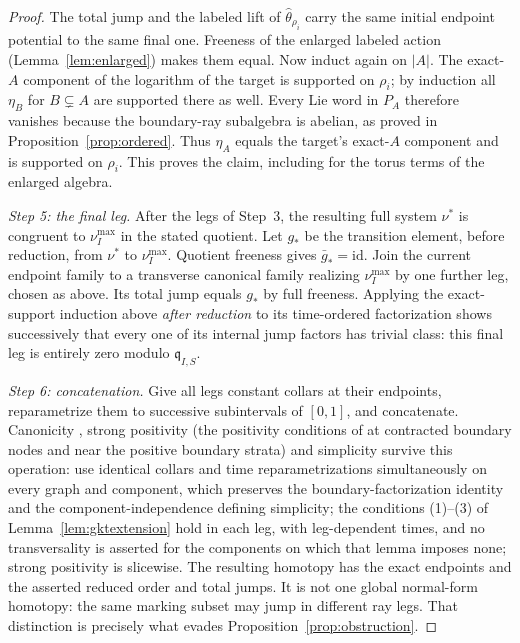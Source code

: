 \documentclass[11pt]{amsart}
\theoremstyle{definition}
\theoremstyle{remark}
\begin{document}
\begin{proof}
The total jump and the labeled lift of $\widehat\theta_{\rho_i}$ carry the same initial
endpoint potential to the same final one. Freeness of the enlarged labeled
action (Lemma~\ref{lem:enlarged}) makes them equal. Now induct again on
$\lvert A\rvert$. The exact-$A$ component of the logarithm of the target is
supported on $\rho_i$; by induction all $\eta_B$ for $B\subsetneq A$ are supported
there as well. Every Lie word in $P_A$ therefore vanishes because the
boundary-ray subalgebra is abelian, as proved in
Proposition~\ref{prop:ordered}. Thus $\eta_A$ equals the target's exact-$A$
component and is supported on $\rho_i$. This proves the claim, including for
the torus terms of the enlarged algebra.

\emph{Step 5: the final leg.}
After the legs of Step~3, the resulting full system $\nu^*$ is congruent to
$\nu_I^{\max}$ in the stated quotient. Let $g_{*}$ be the transition element, before
reduction, from $\nu^*$ to $\nu_I^{\max}$. Quotient freeness gives $\bar g_{*}=\mathrm{id}$. Join
the current endpoint family to a transverse canonical family realizing $\nu_I^{\max}$ by
one further leg, chosen as above. Its total jump equals $g_{*}$ by full
freeness. Applying the exact-support induction above \emph{after reduction} to
its time-ordered factorization shows successively that every one of its
internal jump factors has trivial class: this final leg is entirely
zero modulo $\mathfrak q_{I,S}$.

\emph{Step 6: concatenation.}
Give all legs constant collars at their endpoints, reparametrize them to
successive subintervals of $[0,1]$, and concatenate. Canonicity
\cite[Def.~3.22]{GKT}, strong positivity (the positivity conditions of
\cite[Def.~3.18]{GKT} at contracted boundary nodes and near the positive
boundary strata) and simplicity \cite[Defs.~3.36--3.37]{GKT} survive
this operation: use identical collars and
time reparametrizations simultaneously on every graph and component, which
preserves the boundary-factorization identity \cite[(3.12)]{GKT} and the
component-independence defining simplicity; the conditions (1)--(3) of
Lemma~\ref{lem:gktextension} hold in each leg, with leg-dependent times, and
no transversality is asserted for the components on which that lemma imposes
none; strong positivity is slicewise.
The resulting homotopy has the exact endpoints and the asserted reduced order
and total jumps. It is not one global normal-form homotopy: the same
marking subset may jump in different ray legs. That distinction is precisely
what evades Proposition~\ref{prop:obstruction}.

\end{proof}
\end{document}
